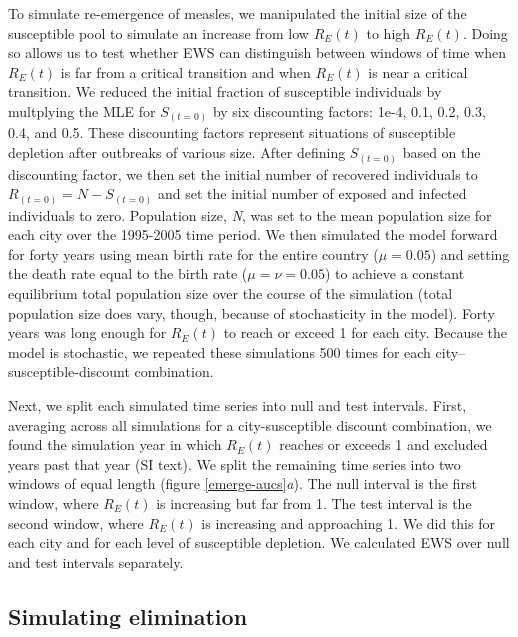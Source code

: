 \documentclass[3p]{elsarticle} %
\begin{document}
To simulate re-emergence of measles, we manipulated the initial size of
the susceptible pool to simulate an increase from low \(R_E(t)\) to high
\(R_E(t)\). Doing so allows us to test whether EWS can distinguish
between windows of time when \(R_E(t)\) is far from a critical
transition and when \(R_E(t)\) is near a critical transition. We reduced
the initial fraction of susceptible individuals by multplying the MLE
for \(S_{(t=0)}\) by six discounting factors: 1e-4, 0.1, 0.2, 0.3, 0.4,
and 0.5. These discounting factors represent situations of susceptible
depletion after outbreaks of various size. After defining \(S_{(t=0)}\)
based on the discounting factor, we then set the initial number of
recovered individuals to \(R_{(t=0)} = N - S_{(t=0)}\) and set the
initial number of exposed and infected individuals to zero. Population
size, \emph{N}, was set to the mean population size for each city over
the 1995-2005 time period. We then simulated the model forward for forty
years using mean birth rate for the entire country (\(\mu = 0.05\)) and
setting the death rate equal to the birth rate (\(\mu = \nu = 0.05\)) to
achieve a constant equilibrium total population size over the course of
the simulation (total population size does vary, though, because of
stochasticity in the model). Forty years was long enough for \(R_E(t)\)
to reach or exceed 1 for each city. Because the model is stochastic, we
repeated these simulations 500 times for each city--susceptible-discount
combination.

Next, we split each simulated time series into null and test intervals.
First, averaging across all simulations for a city-susceptible discount
combination, we found the simulation year in which \(R_E(t)\) reaches or
exceeds 1 and excluded years past that year (SI text). We split the
remaining time series into two windows of equal length (figure
\ref{emerge-aucs}\emph{a}). The null interval is the first window, where
\(R_E(t)\) is increasing but far from 1. The test interval is the second
window, where \(R_E(t)\) is increasing and approaching 1. We did this
for each city and for each level of susceptible depletion. We calculated
EWS over null and test intervals separately.

\hypertarget{simulating-elimination}{%
\subsection{Simulating elimination}\label{simulating-elimination}}
\end{document}
